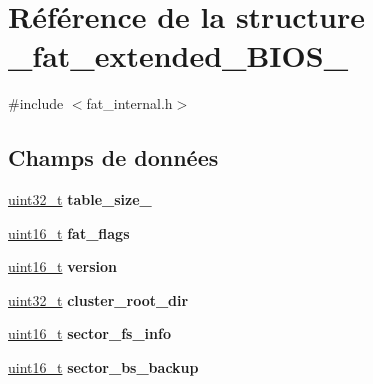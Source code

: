\hypertarget{struct__fat__extended__BIOS__32}{\section{\-Référence de la structure \-\_\-fat\-\_\-extended\-\_\-\-B\-I\-O\-S\-\_}
\label{struct__fat__extended__BIOS__32}
}


{\ttfamily \#include $<$fat\-\_\-internal.\-h$>$}

\subsection*{\-Champs de données}
\begin{DoxyCompactItemize}
\item 
\hypertarget{struct__fat__extended__BIOS__32_afe9918174f4b717fe9ba858b792b6b76}{\hyperlink{types_8h_a33594304e786b158f3fb30289278f5af}{uint32\-\_\-t} {\bfseries table\-\_\-size\-\_}}\label{struct__fat__extended__BIOS__32_afe9918174f4b717fe9ba858b792b6b76}

\item 
\hypertarget{struct__fat__extended__BIOS__32_a58bc295c5eec01f9daec08d84340817e}{\hyperlink{types_8h_adf4d876453337156dde61095e1f20223}{uint16\-\_\-t} {\bfseries fat\-\_\-flags}}\label{struct__fat__extended__BIOS__32_a58bc295c5eec01f9daec08d84340817e}

\item 
\hypertarget{struct__fat__extended__BIOS__32_a9eb3b046449e1e1c868e1ecb1d6a9fe2}{\hyperlink{types_8h_adf4d876453337156dde61095e1f20223}{uint16\-\_\-t} {\bfseries version}}\label{struct__fat__extended__BIOS__32_a9eb3b046449e1e1c868e1ecb1d6a9fe2}

\item 
\hypertarget{struct__fat__extended__BIOS__32_a78cf2bb3768b41a3b054d6c71d5c61e7}{\hyperlink{types_8h_a33594304e786b158f3fb30289278f5af}{uint32\-\_\-t} {\bfseries cluster\-\_\-root\-\_\-dir}}\label{struct__fat__extended__BIOS__32_a78cf2bb3768b41a3b054d6c71d5c61e7}

\item 
\hypertarget{struct__fat__extended__BIOS__32_a38e8b2efc3921f696d435b878fc85007}{\hyperlink{types_8h_adf4d876453337156dde61095e1f20223}{uint16\-\_\-t} {\bfseries sector\-\_\-fs\-\_\-info}}\label{struct__fat__extended__BIOS__32_a38e8b2efc3921f696d435b878fc85007}

\item 
\hypertarget{struct__fat__extended__BIOS__32_aa55ea52137b033ae69f69c4e4e16dc3b}{\hyperlink{types_8h_adf4d876453337156dde61095e1f20223}{uint16\-\_\-t} {\bfseries sector\-\_\-bs\-\_\-backup}}\label{struct__fat__extended__BIOS__32_aa55ea52137b033ae69f69c4e4e16dc3b}


\end{DoxyCompactItemize}
